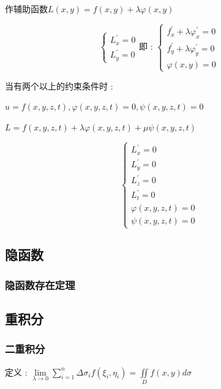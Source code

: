 \documentclass[UTF8,12pt]{ctexbook}
\newcommand{\limNormal}[1]{\lim\limits_{#1}}
\newcommand{\derivative}{^\prime}
\newcommand{\upDownSum}[2]{\sum\limits_{#2}^{#1}}
\newcommand{\defFunction}[1]{f(#1)}
\newcommand{\doubleIntegralOnZone}[1]{\iint\limits_{#1}}
\begin{document}
{{{{    作辅助函数$L(x,y) = \defFunction{x,y} + \lambda\varphi(x,y)$

    $$
      \begin{cases}
        L\derivative_x = 0 \\
        L\derivative_y = 0
      \end{cases}
      \mbox{即 : }
      \begin{cases}
        f\derivative_x + \lambda\varphi\derivative_x = 0 \\
        f\derivative_y + \lambda\varphi\derivative_y = 0 \\
        \varphi(x,y) = 0
      \end{cases}
    $$

    当有两个以上的约束条件时 :

    $u = \defFunction{x,y,z,t},\varphi(x,y,z,t) = 0,\psi(x,y,z,t) = 0$

    $L = \defFunction{x,y,z,t} + \lambda\varphi(x,y,z,t) + \mu\psi(x,y,z,t)$

    $$
      \begin{cases}
        L\derivative_x = 0   \\
        L\derivative_y = 0   \\
        L\derivative_z = 0   \\
        L\derivative_t = 0   \\
        \varphi(x,y,z,t) = 0 \\
        \psi(x,y,z,t) = 0
      \end{cases}
    $$
  }%

}%

\subsection{隐函数}{

  \subsubsection{隐函数存在定理}{
  }%

}%

\subsection{重积分}{

  \subsubsection{二重积分}{
    定义 : $\limNormal{\lambda \to 0}\upDownSum{n}{i = 1}\Delta\sigma_i\defFunction{\xi_i,\eta_i} = \doubleIntegralOnZone{D}\defFunction{x,y}d\sigma$

}}}}
\end{document}
